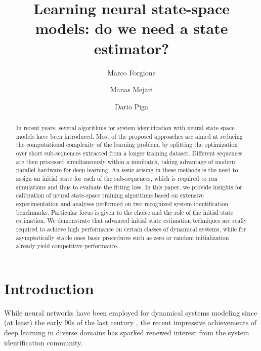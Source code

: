 \documentclass{article}
\title{Learning neural state-space models: do we need a state estimator?}
\author{Marco Forgione}
\author{Manas Mejari}
\author{Dario Piga}
\affil{IDSIA Dalle Molle Institute for Artificial Intelligence USI-SUPSI, Via la Santa 1, CH-6962 Lugano-Viganello, Switzerland.}
\begin{document}
\maketitle


\begin{abstract}
In recent years, several algorithms for system identification with neural state-space models have been introduced. Most of the proposed approaches are aimed at reducing the computational complexity of the learning problem, by splitting the optimization over short sub-sequences extracted from a longer training dataset. Different sequences are then processed simultaneously within a minibatch, taking advantage of modern parallel hardware for deep learning. An issue arising in these methods is the need to assign an initial state for each of the sub-sequences, which is required to run simulations and thus to evaluate the fitting loss. In this paper, we provide insights for calibration of neural state-space training algorithms based on extensive experimentation and analyses performed on two recognized system identification benchmarks. Particular focus is given to the choice and the role of the initial state estimation. We demonstrate that advanced initial state estimation techniques are really required to achieve high performance on certain classes of dynamical systems, while for asymptotically stable ones basic procedures such as zero or random initialization already yield competitive performance.
\end{abstract}



{\section{Introduction}\label{sec:introduction}}

 
While neural networks have been employed for dynamical systems modeling since (at least) the early 90s of the last century \cite{chen1990non}, the recent impressive achievements of deep learning in diverse domains \cite{schmidhuber2015deep} has sparked renewed interest
from the system identification community.
\end{document}
